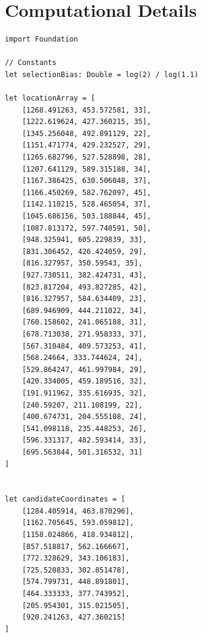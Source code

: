 \documentclass[10pt]{article}
\begin{document}
\section{Computational Details}
\begin{verbatim}
import Foundation

// Constants
let selectionBias: Double = log(2) / log(1.1)

let locationArray = [
    [1268.491263, 453.572581, 33],
    [1222.619624, 427.360215, 35],
    [1345.256048, 492.891129, 22],
    [1151.471774, 429.232527, 29],
    [1265.682796, 527.528898, 28],
    [1207.641129, 589.315188, 34],
    [1167.386425, 630.506048, 37],
    [1166.450269, 582.762097, 45],
    [1142.110215, 528.465054, 37],
    [1045.686156, 503.188844, 45],
    [1087.813172, 597.740591, 50],
    [948.325941, 605.229839, 33],
    [831.306452, 426.424059, 29],
    [816.327957, 350.59543, 35],
    [927.730511, 382.424731, 43],
    [823.817204, 493.827285, 42],
    [816.327957, 584.634409, 23],
    [689.946909, 444.211022, 34],
    [760.158602, 241.065188, 31],
    [678.713038, 271.958333, 37],
    [567.310484, 409.573253, 41],
    [568.24664, 333.744624, 24],
    [529.864247, 461.997984, 29],
    [420.334005, 459.189516, 32],
    [191.911962, 335.616935, 32],
    [240.59207, 211.108199, 22],
    [400.674731, 204.555108, 24],
    [541.098118, 235.448253, 26],
    [596.331317, 482.593414, 33],
    [695.563844, 501.316532, 31]
]


let candidateCoordinates = [
    [1284.405914, 463.870296],
    [1162.705645, 593.059812],
    [1158.024866, 418.934812],
    [857.518817, 562.166667],
    [772.328629, 343.106183],
    [725.520833, 302.851478],
    [574.799731, 448.891801],
    [464.333333, 377.743952],
    [205.954301, 315.021505],
    [920.241263, 427.360215]
]


\end{verbatim}
\end{document}
